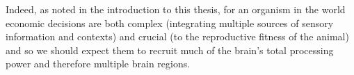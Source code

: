 Indeed, as noted in the introduction to this thesis, for an organism in the world economic decisions are both complex (integrating multiple sources of sensory information and contexts) and crucial (to the reproductive fitness of the animal) and so we should expect them to recruit much of the brain's total processing power and therefore multiple brain regions.